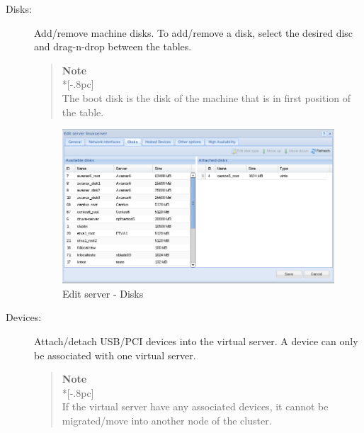 \begin{description}
	\item[Disks:] Add/remove machine disks. To add/remove a disk, select the desired disc and drag-n-drop between the tables.
                    
                \begin{quote}
                    {\large \bf Note} \\*[-.8pc]
                    \underline{\hspace{6in}} \\
                    The boot disk is the disk of the machine that is in first position of the table.
                \end{quote}
                    
		\begin{figure}[H]
        		\begin{center}
		        \includegraphics[scale=0.5]{screenshots/server_edit_disks.png}
        		\caption{Edit server - Disks}
		        \label{fig:server_edit_disks}
	        	\end{center}
		\end{figure}
    \item[Devices:] Attach/detach USB/PCI devices into the virtual server. A device can only be associated with one virtual server. 
                \begin{quote}
                    {\large \bf Note} \\*[-.8pc]
                    \underline{\hspace{6in}} \\
                    If the virtual server have any associated devices, it cannot be migrated/move into another node of the cluster.
                \end{quote}
    

\end{description}
